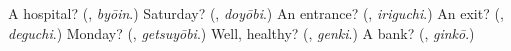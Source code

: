 \begin{tcolorbox}[breakable,colback=teal!4,colframe=teal!35!black,title={Before you move on}]
A hospital? (\textbf{}, \emph{byōin}.) Saturday? (\textbf{}, \emph{doyōbi}.) An entrance? (\textbf{}, \emph{iriguchi}.) An exit? (\textbf{}, \emph{deguchi}.) Monday? (\textbf{}, \emph{getsuyōbi}.) Well, healthy? (\textbf{}, \emph{genki}.) A bank? (\textbf{}, \emph{ginkō}.)
\end{tcolorbox}
